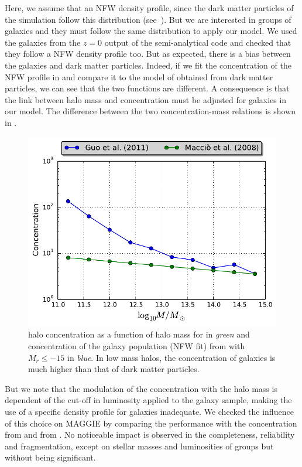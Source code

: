 Here, we assume that an NFW density profile, since the dark matter particles of
the \citet{Borgani+04} simulation follow this distribution (see~\cite{MBM+10}).
But we are interested in groups of galaxies and they must follow the same
distribution to apply our model. We used the galaxies from the $z=0$ output of
the \citet{Guo+11} semi-analytical code and checked that they follow a NFW
density profile too. But as expected, there is a bias between the galaxies and
dark matter particles. Indeed, if we fit the concentration of the NFW profile
in \citet{Guo+11} and compare it to the model of \citet{Maccio+08} obtained
from dark matter particles, we can see that the two functions are different. A
consequence is that the link between halo mass and concentration must be
adjusted for galaxies in our model. The difference between the two
concentration-mass relations is shown in .
%
\begin{figure}[ht]
    \centering
    \includegraphics[width=0.8\linewidth]{figures/maggie/concentrations.pdf}
    \caption{halo concentration as a function of halo mass for
        \citet{Maccio+08} in \emph{green} and concentration of the galaxy
        population (NFW fit) from \citet{Guo+11} with $M_r\leqslant-15$ in
        \emph{blue}. In low mass halos, the concentration of galaxies is much
    higher than that of dark matter particles.\label{fig:concentration_bias}}
\end{figure}
%
But we note that the modulation of the concentration with the halo mass is
dependent of the cut-off in luminosity applied to the galaxy sample, making the
use of a specific density profile for galaxies inadequate. We checked the
influence of this choice on MAGGIE by comparing the performance with the
concentration from \citet{Guo+11} and from \citet{Maccio+08}. No noticeable
impact is observed in the completeness, reliability and fragmentation, except
on stellar masses and luminosities of groups but without being significant.

